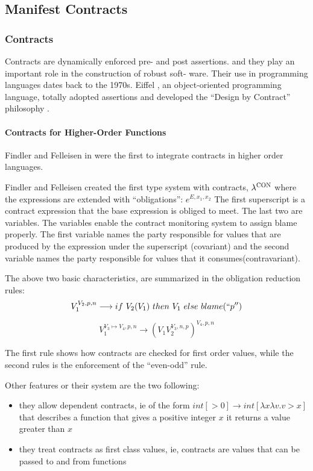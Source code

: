 \subsection{Manifest Contracts}

\subsubsection{Contracts}
Contracts are dynamically enforced pre- and post assertions.
and they play an important role in the construction of robust soft- 
ware. 
Their use in programming languages dates back to the 1970s. 
Eiffel \cite{Eiffel}, an object-oriented programming language,
totally adopted assertions and developed the 
``Design by Contract'' philosophy \cite{Meyer92}.

 
\paragraph*{Contracts for Higher-Order Functions}
Findler and Felleisen in \cite{Findler02} were the first to
integrate contracts in higher order languages.




Findler and Felleisen  created the first type system with contracts, $\lambda^{\textsc{CON}}$ 
where the expressions are extended with ``obligations'':
$e^{E, x_1, x_2}$
The first superscript is a contract expression that the base expression
is obliged to meet. The last two are variables. The variables enable
the contract monitoring system to assign blame properly. The first
variable names the party responsible for values that are produced by
the expression under the superscript (covariant) and the second variable names
the party responsible for values that it consumes(contravariant).


The above two basic characteristics, are summarized in the obligation reduction rules:
$$
V_1^{V_2, p, n} \longrightarrow if \ V_2(V_1) \ then \  V_1  \ else \ blame(``p'')
$$

$$
V_1^{V_3\longmapsto V_4, p, n} \longrightarrow (V_1 V_2^{V_3, n, p})^{V_4, p, n}
$$

The first rule shows how contracts are checked for first order values, while
the second rules is the enforcement of the ``even-odd'' rule.

Other features or their system are the two following:
\begin{itemize}
\item they allow dependent contracts, ie of the form $int [>0] \rightarrow int [\lambda x \lambda v. v >x]$
that describes a function that gives a positive integer $x$ it returns a value greater than $x$
\item they treat contracts as first class values, ie, contracts are values that can be passed to and from functions
\end{itemize}


